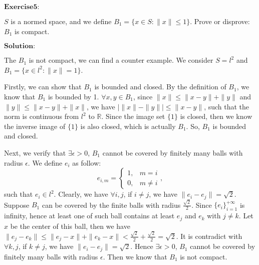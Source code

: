 \documentclass[12pt,a4paper]{ctexart}
\begin{document}
$\textbf{Exercise5:}$

$S$ is a normed space, and we define $B_{1} = \{ x \in S: \|x\| \leq 1 \}$. Prove or disprove: $B_{1}$ is compact.

\vspace{8pt}
$\textbf{Solution:}$

The $B_{1}$ is not compact, we can find a counter example. We consider $S = l^{2}$ and $B_{1} = \{ x \in l^{2}: \|x\| = 1 \}$. 

Firstly, we can show that $B_{1}$ is bounded and closed. By the definition of $B_{1}$, we know that $B_{1}$ is bounded by 1. $\forall x, y \in B_{1}$, since $\|x\| \leq \|x - y \| + \|y\|$ and $\|y\| \leq \|x - y \| + \|x\|$, we have $| \|x\| - \|y\| | \leq \|x - y\|$, such that the norm is continuous from $l^{2}$ to $\mathbb{R}$. Since the image set $\{1\}$ is closed, then we know the inverse image of $\{1\}$ is also closed, which is actually $B_{1}$. So, $B_{1}$ is bounded and closed.

Next, we verify that $\exists \epsilon > 0$, $B_{1}$ cannot be covered by finitely many balls with radius $\epsilon$. We define $e_{i}$ as follow:
\begin{equation*}
e_{i,m} =
\left\{
             \begin{array}{cl}
             1, & m = i \\
             0, & m \neq i
             \end{array},
\right.
\end{equation*}
such that $e_{i} \in l^{2}$. Clearly, we have $\forall i, j$, if $i \neq j$,  we have  $\|e_{i} - e_{j} \| = \sqrt{2}$. Suppose $B_{1}$ can be covered by the finite balls with radius $\frac{\sqrt{2}}{2}$. Since $\{e_{i}\}_{i = 1}^{+ \infty}$ is infinity, hence at least one of such ball contains at least $e_{j}$ and $e_{k}$ with $j \neq k$. Let $x$ be the center of this ball, then we have $\|e_{j}  - e_{k}\| \leq \|e_{j} - x\| + \|e_{k} - x\| < \frac{\sqrt{2}}{2} + \frac{\sqrt{2}}{2} =  \sqrt{2}$. It is contradict with $\forall k, j$, if $k \neq j$,  we have  $\|e_{i} - e_{j} \| = \sqrt{2}$. Hence $\exists \epsilon > 0$, $B_{1}$ cannot be covered by finitely many balls with radius $\epsilon$. Then we know  that $B_{1}$ is  not compact.
\end{document}
